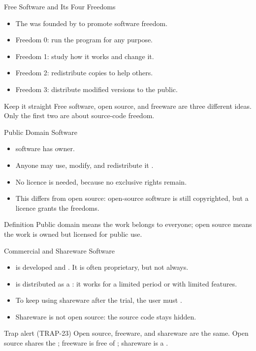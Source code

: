 \documentclass[aspectratio=169]{beamer}
\begin{document}
\begin{frame}{Free Software and Its Four Freedoms}
  \begin{itemize}
    \item The  was founded by
       to promote software freedom.
    \item Freedom 0: run the program for any purpose.
    \item Freedom 1: study how it works and change it.
    \item Freedom 2: redistribute copies to help others.
    \item Freedom 3: distribute modified versions to the public.
  \end{itemize}
  \begin{block}{Keep it straight}
    Free software, open source, and freeware are three different ideas. Only
    the first two are about source-code freedom.
  \end{block}
\end{frame}

\begin{frame}{Public Domain Software}
  \begin{itemize}
    \item {} software has  owner.
    \item Anyone may use, modify, and redistribute it .
    \item No licence is needed, because no exclusive rights remain.
    \item This differs from open source: open-source software is still
      copyrighted, but a licence grants the freedoms.
  \end{itemize}
  \begin{block}{Definition}
    Public domain means the work belongs to everyone; open source means the
    work is owned but licensed for public use.
  \end{block}
\end{frame}

\begin{frame}{Commercial and Shareware Software}
  \begin{itemize}
    \item {} is developed and .
      It is often proprietary, but not always.
    \item {} is distributed as a : it works for a
      limited period or with limited features.
    \item To keep using shareware after the trial, the user must .
    \item Shareware is not open source: the source code stays hidden.
  \end{itemize}
  \begin{alertblock}{Trap alert (TRAP-23)}
    Open source, freeware, and shareware are  the same. Open source
    shares the ; freeware is free of ; shareware is a
    .
  \end{alertblock}
\end{frame}
\end{document}
